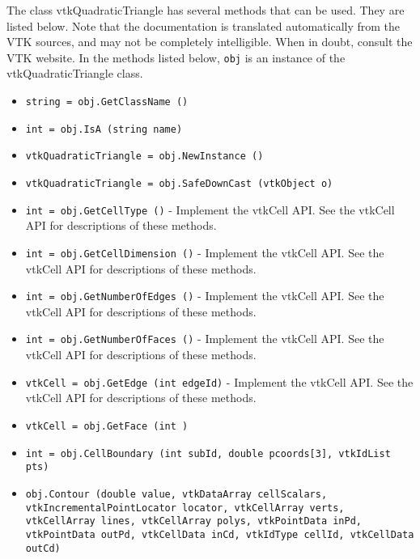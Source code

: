 The class vtkQuadraticTriangle has several methods that can be used.
  They are listed below.
Note that the documentation is translated automatically from the VTK sources,
and may not be completely intelligible.  When in doubt, consult the VTK website.
In the methods listed below, \verb|obj| is an instance of the vtkQuadraticTriangle class.
\begin{itemize}
\item  \verb|string = obj.GetClassName ()|

\item  \verb|int = obj.IsA (string name)|

\item  \verb|vtkQuadraticTriangle = obj.NewInstance ()|

\item  \verb|vtkQuadraticTriangle = obj.SafeDownCast (vtkObject o)|

\item  \verb|int = obj.GetCellType ()| -  Implement the vtkCell API. See the vtkCell API for descriptions
 of these methods.

\item  \verb|int = obj.GetCellDimension ()| -  Implement the vtkCell API. See the vtkCell API for descriptions
 of these methods.

\item  \verb|int = obj.GetNumberOfEdges ()| -  Implement the vtkCell API. See the vtkCell API for descriptions
 of these methods.

\item  \verb|int = obj.GetNumberOfFaces ()| -  Implement the vtkCell API. See the vtkCell API for descriptions
 of these methods.

\item  \verb|vtkCell = obj.GetEdge (int edgeId)| -  Implement the vtkCell API. See the vtkCell API for descriptions
 of these methods.

\item  \verb|vtkCell = obj.GetFace (int )|

\item  \verb|int = obj.CellBoundary (int subId, double pcoords[3], vtkIdList pts)|

\item  \verb|obj.Contour (double value, vtkDataArray cellScalars, vtkIncrementalPointLocator locator, vtkCellArray verts, vtkCellArray lines, vtkCellArray polys, vtkPointData inPd, vtkPointData outPd, vtkCellData inCd, vtkIdType cellId, vtkCellData outCd)|


\end{itemize}

